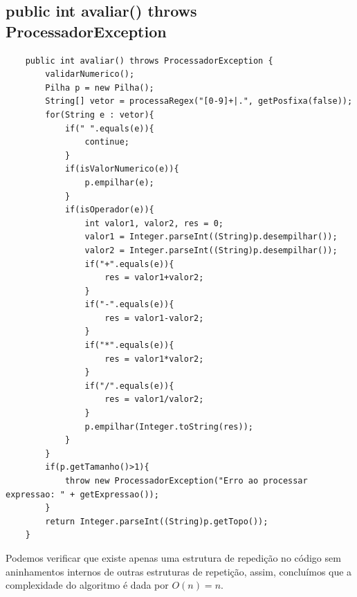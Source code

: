 \documentclass[a4paper,11pt]{article}
\begin{document}
\subsection{public int avaliar() throws ProcessadorException}
\begin{lstlisting}
    public int avaliar() throws ProcessadorException {
        validarNumerico();        
        Pilha p = new Pilha();
        String[] vetor = processaRegex("[0-9]+|.", getPosfixa(false));
        for(String e : vetor){
            if(" ".equals(e)){
                continue;
            }            
            if(isValorNumerico(e)){
                p.empilhar(e);
            }            
            if(isOperador(e)){
                int valor1, valor2, res = 0;
                valor1 = Integer.parseInt((String)p.desempilhar());
                valor2 = Integer.parseInt((String)p.desempilhar());
                if("+".equals(e)){
                    res = valor1+valor2;
                }                
                if("-".equals(e)){
                    res = valor1-valor2;
                }                
                if("*".equals(e)){
                    res = valor1*valor2;
                }                
                if("/".equals(e)){
                    res = valor1/valor2;
                }              
                p.empilhar(Integer.toString(res));
            }
        }
        if(p.getTamanho()>1){
            throw new ProcessadorException("Erro ao processar expressao: " + getExpressao());
        }
        return Integer.parseInt((String)p.getTopo());
    }
\end{lstlisting}
Podemos verificar que existe apenas uma estrutura de repedição no código sem aninhamentos internos de outras estruturas de repetição, assim, concluímos que a complexidade do algoritmo é dada por \(O(n)=n\).
\end{document}
